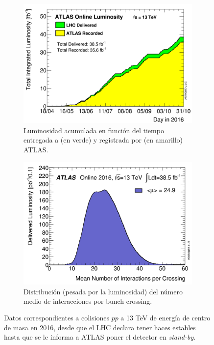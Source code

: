 \begin{figure}
    \centering
    \begin{subfigure}[b]{0.47\textwidth}
        \centering
        \includegraphics[width=\textwidth]{images/Lumi}
        \caption{Luminosidad acumulada en función del tiempo entregada a (en verde) y registrada por (en amarillo) ATLAS.}
        \label{fig:Lumi}
    \end{subfigure}
    \hfill
    \begin{subfigure}[b]{0.46\textwidth}
        \centering
        \includegraphics[width=\textwidth]{images/muATLAS}
        \caption{Distribución (pesada por la luminosidad) del número medio de interacciones por bunch crossing.}
        \label{fig:muATLAS}
    \end{subfigure}
    \caption{ Datos correspondientes a colisiones $pp$ a 13 TeV de energía de centro de masa en 2016, desde que el LHC declara tener haces estables hasta que se le informa a ATLAS poner el detector en \emph{stand-by}\cite{LumiATLAS}.}
    \label{fig:Data2016}
\end{figure}

